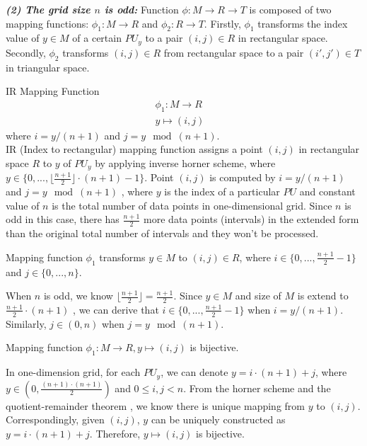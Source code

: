 \documentclass[AMA,LATO1COL]{WileyNJD-v2}
\begin{document}
\noindent \textbf{\emph {(2) The grid size $n$ is odd:}} Function $\phi:  M \rightarrow  R \rightarrow  T$ is composed of two mapping functions: $\phi_1:  M \rightarrow  R$ and $\phi_2:  R \rightarrow  T$. Firstly, $\phi_1$ transforms the index value of $y\in  M$ of a certain $PU_y$ to a pair $(i,j)\in  R$ in rectangular space. Secondly, $\phi_2$ transforms  $(i,j)\in  R$ from rectangular space to a pair $(i',j')\in  T$ in triangular space.
\vspace{5mm}
\noindent\begin{definition}
IR Mapping Function
\begin{eqnarray}
\phi_1:   M \rightarrow  R & \\
y \mapsto (i,j)
\end{eqnarray}
 where  $i  = y / (n+1)$ and $j = y \mod (n+1)$.\\
 IR (Index to rectangular) mapping function assigns a point $(i,j)$ in rectangular space $R$ to $y$ of $PU_y$  by applying inverse horner scheme, where $y\in \{0,...,\lfloor \frac{n+1}{2}\rfloor \cdot (n+1)-1\}$.  Point $(i,j)$ is computed by $i  = y / (n+1)$ and $j = y \mod (n+1)$ , where $y$ is the index of a particular $PU$ and constant value of $n$ is the total number of data points in one-dimensional grid. Since $n$ is odd in this case, there has $\frac{n+1}{2}$ more data points (intervals) in the extended form than the original total number of intervals and they  won't be processed.
\end{definition}
 \vspace{5mm}
\begin{lemma}
Mapping function $\phi_1$ transforms $y\in M$ to $(i,j) \in R$, where $i \in \{0,...,\frac{n+1}{2}-1\}$ and $j \in \{0,...,n\}$.
\end{lemma}
When $n$ is odd, we know $ {\lfloor \frac{n+1}{2}\rfloor} = {\frac{n+1}{2}}$.  Since $y\in M$ and size of $M$ is extend to $  \frac{n+1}{2} \cdot (n+1)$ , we can derive that $i\in \{0,...,\frac{n+1}{2}-1\}$ when $i  = y / (n+1)$. Similarly, $j\in (0,n)$ when $j = y \mod (n+1)$.
\vspace{5mm}
\begin{lemma}
Mapping function $\phi_1:   M \rightarrow  R,y \mapsto (i,j)$ is bijective.
\end{lemma}
 In one-dimension grid, for each $PU_y$, we can denote $y=i\cdot (n+1)+j$, where $y \in (0,{\frac{(n+1) \cdot (n+1)}{2}})$ and $0\leq i, j < n$. From the horner scheme and the quotient-remainder theorem , we know there is unique mapping from $y$ to $(i,j)$. Correspondingly, given $(i,j)$, $y$ can be uniquely constructed as $y=i\cdot (n+1)+j$. Therefore, $y \mapsto (i,j)$ is bijective.
\end{document}
